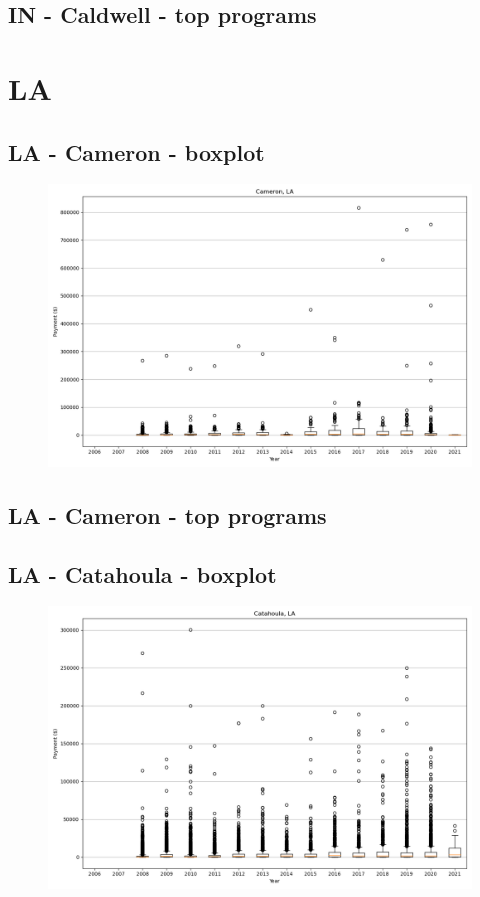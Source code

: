 \subsection*{IN - Caldwell - top programs}

\newpage
\section*{LA}
\subsection*{LA - Cameron - boxplot}
\begin{figure}[h]
\centering
\includegraphics[width=7in]{../output/boxplots/counties/Cameron-LA_boxplot.png}
\end{figure}


\subsection*{LA - Cameron - top programs}

\newpage
\subsection*{LA - Catahoula - boxplot}
\begin{figure}[h]
\centering
\includegraphics[width=7in]{../output/boxplots/counties/Catahoula-LA_boxplot.png}
\end{figure}


